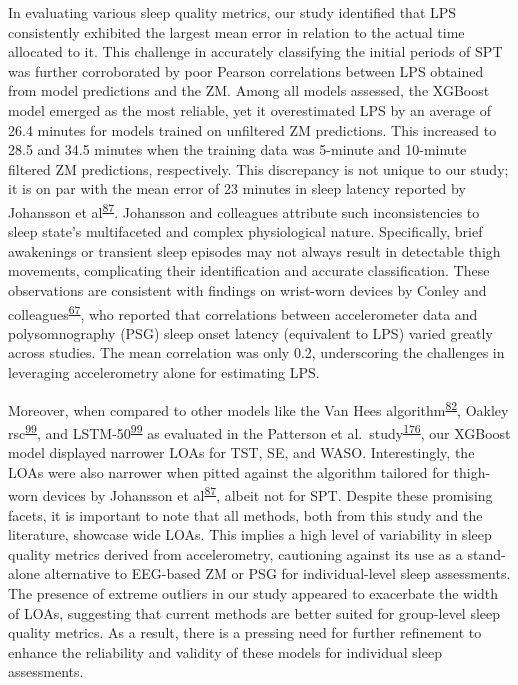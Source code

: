 \documentclass[
  10pt,
]{scrbook}
\begin{document}
In evaluating various sleep quality metrics, our study identified that
LPS consistently exhibited the largest mean error in relation to the
actual time allocated to it. This challenge in accurately classifying
the initial periods of SPT was further corroborated by poor Pearson
correlations between LPS obtained from model predictions and the ZM.
Among all models assessed, the XGBoost model emerged as the most
reliable, yet it overestimated LPS by an average of 26.4 minutes for
models trained on unfiltered ZM predictions. This increased to 28.5 and
34.5 minutes when the training data was 5-minute and 10-minute filtered
ZM predictions, respectively. This discrepancy is not unique to our
study; it is on par with the mean error of 23 minutes in sleep latency
reported by Johansson et
al\textsuperscript{\protect\hyperlink{ref-johansson_development_2023}{87}}.
Johansson and colleagues attribute such inconsistencies to sleep state's
multifaceted and complex physiological nature. Specifically, brief
awakenings or transient sleep episodes may not always result in
detectable thigh movements, complicating their identification and
accurate classification. These observations are consistent with findings
on wrist-worn devices by Conley and
colleagues\textsuperscript{\protect\hyperlink{ref-conley_agreement_2019}{67}},
who reported that correlations between accelerometer data and
polysomnography (PSG) sleep onset latency (equivalent to LPS) varied
greatly across studies. The mean correlation was only 0.2, underscoring
the challenges in leveraging accelerometry alone for estimating LPS.

Moreover, when compared to other models like the Van Hees
algorithm\textsuperscript{\protect\hyperlink{ref-hees_novel_2015}{82}},
Oakley
rsc\textsuperscript{\protect\hyperlink{ref-palotti_benchmark_2019}{99}},
and
LSTM-50\textsuperscript{\protect\hyperlink{ref-palotti_benchmark_2019}{99}}
as evaluated in the Patterson et
al.~study\textsuperscript{\protect\hyperlink{ref-patterson_40_2023}{176}},
our XGBoost model displayed narrower LOAs for TST, SE, and WASO.
Interestingly, the LOAs were also narrower when pitted against the
algorithm tailored for thigh-worn devices by Johansson et
al\textsuperscript{\protect\hyperlink{ref-johansson_development_2023}{87}},
albeit not for SPT. Despite these promising facets, it is important to
note that all methods, both from this study and the literature, showcase
wide LOAs. This implies a high level of variability in sleep quality
metrics derived from accelerometry, cautioning against its use as a
stand-alone alternative to EEG-based ZM or PSG for individual-level
sleep assessments. The presence of extreme outliers in our study
appeared to exacerbate the width of LOAs, suggesting that current
methods are better suited for group-level sleep quality metrics. As a
result, there is a pressing need for further refinement to enhance the
reliability and validity of these models for individual sleep
assessments.
\end{document}
